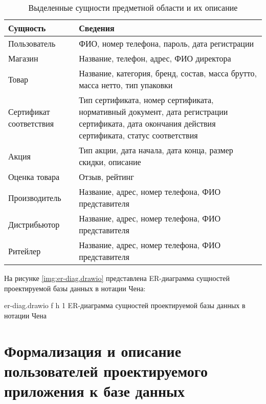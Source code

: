 \begin{table}[ht]
	\begin{center}
		\begin{threeparttable}
			\caption{Выделенные сущности предметной области и их описание}
			\label{tbl:db_entities}
			\begin{tabular}{|p{4.5cm}|p{10cm}|}
				\hline
				\textbf{Сущность} & \textbf{Сведения} \\ \hline
				Пользователь & ФИО, номер телефона, пароль, дата регистрации \\ 
				\hline
				Магазин & Название, телефон, адрес, ФИО директора \\ 
				\hline
				Товар & Название, категория, бренд, состав, масса брутто, масса нетто, тип упаковки \\ 
				\hline
				Сертификат соответствия & Тип сертификата, номер сертификата, нормативный документ, дата регистрации сертификата, дата окончания действия сертификата, статус соответствия \\ 
				\hline
				Акция & Тип акции, дата начала, дата конца, размер скидки, описание \\ 
				\hline
				Оценка товара & Отзыв, рейтинг \\ 
				\hline
				Производитель & Название, адрес, номер телефона, ФИО представителя \\ 
				\hline
				Дистрибьютор & Название, адрес, номер телефона, ФИО представителя \\ 
				\hline
				Ритейлер & Название, адрес, номер телефона, ФИО представителя \\ 
				\hline
			\end{tabular}
		\end{threeparttable}
	\end{center}
\end{table}

\clearpage

На рисунке \ref{img:er-diag.drawio} представлена ER-диаграмма сущностей проектируемой базы данных в нотации Чена:

{er-diag.drawio} %
{f} %
{h} %
{1\textwidth} %
{ER-диаграмма сущностей проектируемой базы данных в нотации Чена} %

\clearpage

\section{Формализация и описание пользователей проектируемого приложения к базе данных}

